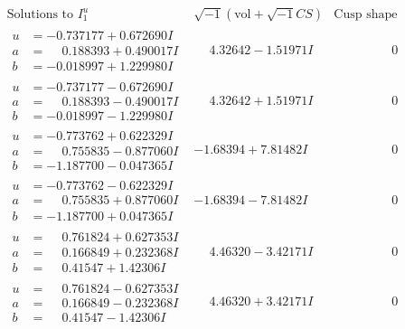 \documentclass[1p]{elsarticle_modified}
\theoremstyle{definition}
\newcommand{\I}{\sqrt{-1}}
\begin{document}
$$\begin{array}{c|c|c}  
\text{Solutions to }I^u_{1}& \I (\text{vol} + \sqrt{-1}CS) & \text{Cusp shape}\\
 \hline 
\begin{aligned}
u &= -0.737177 + 0.672690 I \\
a &= \phantom{-}0.188393 + 0.490017 I \\
b &= -0.018997 + 1.229980 I\end{aligned}
 & \phantom{-}4.32642 - 1.51971 I & \phantom{-0.000000 } 0 \\ \hline\begin{aligned}
u &= -0.737177 - 0.672690 I \\
a &= \phantom{-}0.188393 - 0.490017 I \\
b &= -0.018997 - 1.229980 I\end{aligned}
 & \phantom{-}4.32642 + 1.51971 I & \phantom{-0.000000 } 0 \\ \hline\begin{aligned}
u &= -0.773762 + 0.622329 I \\
a &= \phantom{-}0.755835 - 0.877060 I \\
b &= -1.187700 - 0.047365 I\end{aligned}
 & -1.68394 + 7.81482 I & \phantom{-0.000000 } 0 \\ \hline\begin{aligned}
u &= -0.773762 - 0.622329 I \\
a &= \phantom{-}0.755835 + 0.877060 I \\
b &= -1.187700 + 0.047365 I\end{aligned}
 & -1.68394 - 7.81482 I & \phantom{-0.000000 } 0 \\ \hline\begin{aligned}
u &= \phantom{-}0.761824 + 0.627353 I \\
a &= \phantom{-}0.166849 + 0.232368 I \\
b &= \phantom{-}0.41547 + 1.42306 I\end{aligned}
 & \phantom{-}4.46320 - 3.42171 I & \phantom{-0.000000 } 0 \\ \hline\begin{aligned}
u &= \phantom{-}0.761824 - 0.627353 I \\
a &= \phantom{-}0.166849 - 0.232368 I \\
b &= \phantom{-}0.41547 - 1.42306 I\end{aligned}
 & \phantom{-}4.46320 + 3.42171 I & \phantom{-0.000000 } 0 \\ \hline\begin{aligned}

\end{aligned}
\end{array}$$
\end{document}
